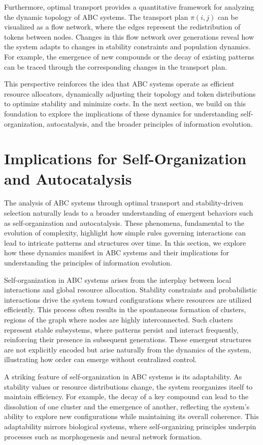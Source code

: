 \documentclass[%
 preprint, linenumbers,
 amsmath,amssymb,
 aps, physrev,
]{revtex4-2}
\begin{document}
Furthermore, optimal transport provides a quantitative framework for analyzing the dynamic topology of ABC systems. The transport plan $\pi(i, j)$ can be visualized as a flow network, where the edges represent the redistribution of tokens between nodes. Changes in this flow network over generations reveal how the system adapts to changes in stability constraints and population dynamics. For example, the emergence of new compounds or the decay of existing patterns can be traced through the corresponding changes in the transport plan.

This perspective reinforces the idea that ABC systems operate as efficient resource allocators, dynamically adjusting their topology and token distributions to optimize stability and minimize costs. In the next section, we build on this foundation to explore the implications of these dynamics for understanding self-organization, autocatalysis, and the broader principles of information evolution.

\section{Implications for Self-Organization and Autocatalysis}

The analysis of ABC systems through optimal transport and stability-driven selection naturally leads to a broader understanding of emergent behaviors such as self-organization and autocatalysis. These phenomena, fundamental to the evolution of complexity, highlight how simple rules governing interactions can lead to intricate patterns and structures over time. In this section, we explore how these dynamics manifest in ABC systems and their implications for understanding the principles of information evolution.

Self-organization in ABC systems arises from the interplay between local interactions and global resource allocation. Stability constraints and probabilistic interactions drive the system toward configurations where resources are utilized efficiently. This process often results in the spontaneous formation of clusters, regions of the graph where nodes are highly interconnected. Such clusters represent stable subsystems, where patterns persist and interact frequently, reinforcing their presence in subsequent generations. These emergent structures are not explicitly encoded but arise naturally from the dynamics of the system, illustrating how order can emerge without centralized control.

A striking feature of self-organization in ABC systems is its adaptability. As stability values or resource distributions change, the system reorganizes itself to maintain efficiency. For example, the decay of a key compound can lead to the dissolution of one cluster and the emergence of another, reflecting the system’s ability to explore new configurations while maintaining its overall coherence. This adaptability mirrors biological systems, where self-organizing principles underpin processes such as morphogenesis and neural network formation.
\end{document}
